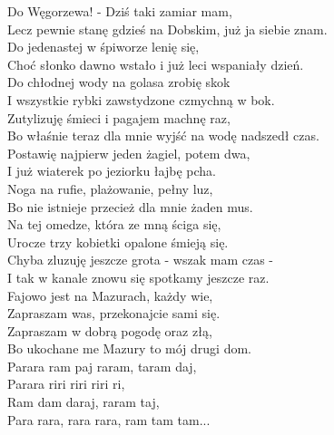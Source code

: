 Do Węgorzewa! - Dziś taki zamiar mam, \\
Lecz pewnie stanę gdzieś na Dobskim, już ja siebie znam. \\
Do jedenastej w śpiworze lenię się, \\
Choć słonko dawno wstało i już leci wspaniały dzień. \\
Do chłodnej wody na golasa zrobię skok \\
I wszystkie rybki zawstydzone czmychną w bok. \\
Zutylizuję śmieci i pagajem machnę raz, \\
Bo właśnie teraz dla mnie wyjść na wodę nadszedł czas. \\

Postawię najpierw jeden żagiel, potem dwa, \\
I już wiaterek po jeziorku łajbę pcha. \\
Noga na rufie, plażowanie, pełny luz, \\
Bo nie istnieje przecież dla mnie żaden mus. \\
Na tej omedze, która ze mną ściga się, \\
Urocze trzy kobietki opalone śmieją się. \\
Chyba zluzuję jeszcze grota - wszak mam czas - \\
I tak w kanale znowu się spotkamy jeszcze raz. \\

Fajowo jest na Mazurach, każdy wie, \\
Zapraszam was, przekonajcie sami się. \\
Zapraszam w dobrą pogodę oraz złą, \\
Bo ukochane me Mazury to mój drugi dom. \\
Parara ram paj raram, taram daj, \\
Parara riri riri riri ri, \\
Ram dam daraj, raram taj, \\
Para rara, rara rara, ram tam tam... \\